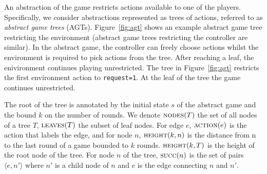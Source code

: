\documentclass{llncs}
\begin{document}
An abstraction of the game restricts actions available to one of the players.
Specifically, we consider abstractions represented as trees of actions,
referred to as \emph{abstract game trees} (AGTs).  Figure~\ref{fig:agt} shows
an example abstract game tree restricting the environment (abstract game trees
restricting the controller are similar).  In the abstract game, the controller
can freely choose actions whilst the environment is required to pick actions
from the tree.  After reaching a leaf, the enivironment continues playing
unrestricted.  The tree in Figure~\ref{fig:agt} restricts the first environment
action to \texttt{request=1}. At the leaf of the tree the game continues
unrestricted.

The root of the tree is annotated by the initial state $s$ of the abstract game
and the bound $k$ on the number of rounds.  We denote $\textsc{nodes}(T)$ the
set of all nodes of a tree $T$, $\textsc{leaves}(T)$ the subset of leaf nodes.
For edge $e$, $\textsc{action}(e)$ is the action that labels the edge, and for
node $n$, $\textsc{height}(k, n)$ is the distance from n to the last round of a
game bounded to $k$ rounds.  $\textsc{height}(k, T)$ is the height of the root
node of the tree.  For node $n$ of the tree, $\textsc{succ}(n)$ is the set of
pairs $\langle e, n' \rangle$ where $n'$ is a child node of $n$ and $e$ is the
edge connecting $n$ and $n'$.
\end{document}
